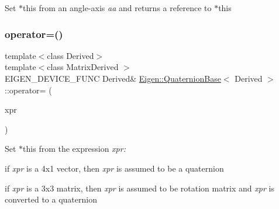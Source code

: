 Set {\ttfamily $\ast$this} from an angle-\/axis {\itshape aa} and returns a reference to {\ttfamily $\ast$this} \mbox{\label{class_eigen_1_1_quaternion_base_a537abceba3bbb467e961e582877d45cb}} 
\subsubsection{\texorpdfstring{operator=()}{operator=()}\hspace{0.1cm}{\footnotesize\ttfamily [2/2]}}
{\footnotesize\ttfamily template$<$class Derived$>$ \\
template$<$class Matrix\+Derived $>$ \\
E\+I\+G\+E\+N\+\_\+\+D\+E\+V\+I\+C\+E\+\_\+\+F\+U\+NC Derived\& \mbox{\hyperlink{class_eigen_1_1_quaternion_base}{Eigen\+::\+Quaternion\+Base}}$<$ Derived $>$\+::operator= (\begin{DoxyParamCaption}\item[{const \mbox{\hyperlink{class_eigen_1_1_matrix_base}{Matrix\+Base}}$<$ Matrix\+Derived $>$ \&}]{xpr }\end{DoxyParamCaption})\hspace{0.3cm}{\ttfamily [inline]}}

Set {\ttfamily $\ast$this} from the expression {\itshape xpr\+:} 
\begin{DoxyItemize}
\item if {\itshape xpr} is a 4x1 vector, then {\itshape xpr} is assumed to be a quaternion
\item if {\itshape xpr} is a 3x3 matrix, then {\itshape xpr} is assumed to be rotation matrix and {\itshape xpr} is converted to a quaternion 
\end{DoxyItemize}\mbox{\label{class_eigen_1_1_quaternion_base_a61ce1b4b1faf6849c9663fd86e9b3a70}} 
